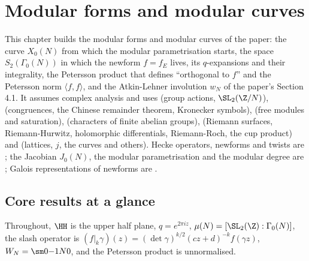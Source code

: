 \chapter{Modular forms and modular curves}\label{ch:modforms}

This chapter builds the modular forms and modular curves of the paper: the curve $X_0(N)$ from which the modular parametrisation starts, the space $S_2(\Gamma_0(N))$ in which the
newform $f=f_E$ lives, its $q$-expansions and their integrality, the Petersson product that defines ``orthogonal to $f$'' and the Petersson norm $\langle f,f\rangle$, and the
Atkin-Lehner involution $w_N$ of the paper's Section 4.1. It assumes complex analysis and uses  (group actions, $\SL_2(\Z/N)$),  (congruences, the
Chinese remainder theorem, Kronecker symbols),  (free modules and saturation),  (characters of finite abelian groups),  (Riemann
surfaces, Riemann-Hurwitz, holomorphic differentials, Riemann-Roch, the cup product) and  (lattices, $j$, the curves  and others). Hecke operators,
newforms and twists are ; the Jacobian $J_0(N)$, the modular parametrisation and the modular degree are ; Galois representations of newforms are
.

\section*{Core results at a glance}

Throughout, $\HH$ is the upper half plane, $q=e^{2\pi iz}$, $\mu(N)=[\SL_2(\Z):\Gamma_0(N)]$, the slash operator is $(f|_k\gamma)(z)=(\det\gamma)^{k/2}(cz+d)^{-k}f(\gamma z)$, $W_N=\sm0{-1}N0$, and
the Petersson product is unnormalised.

